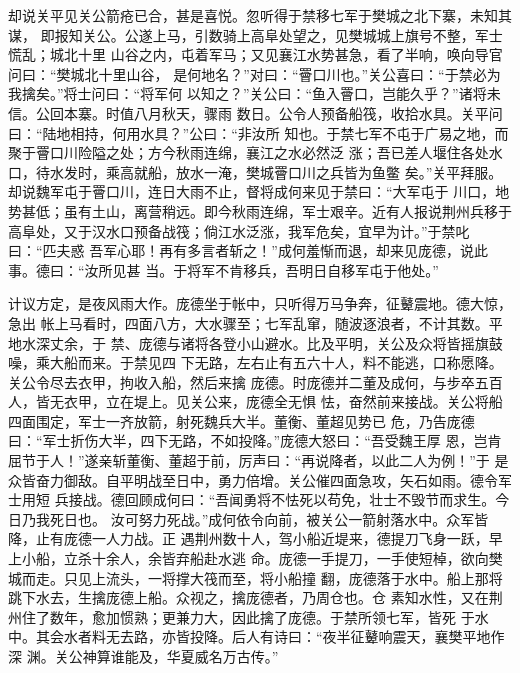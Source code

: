 却说关平见关公箭疮已合，甚是喜悦。忽听得于禁移七军于樊城之北下寨，未知其谋，
即报知关公。公遂上马，引数骑上高阜处望之，见樊城城上旗号不整，军士慌乱；城北十里
山谷之内，屯着军马；又见襄江水势甚急，看了半响，唤向导官问曰：“樊城北十里山谷，
是何地名？”对曰：“罾口川也。”关公喜曰：“于禁必为我擒矣。”将士问曰：“将军何
以知之？”关公曰：“鱼入罾口，岂能久乎？”诸将未信。公回本寨。时值八月秋天，骤雨
数日。公令人预备船筏，收拾水具。关平问曰：“陆地相持，何用水具？”公曰：“非汝所
知也。于禁七军不屯于广易之地，而聚于罾口川险隘之处；方今秋雨连绵，襄江之水必然泛
涨；吾已差人堰住各处水口，待水发时，乘高就船，放水一淹，樊城罾口川之兵皆为鱼鳖
矣。”关平拜服。却说魏军屯于罾口川，连日大雨不止，督将成何来见于禁曰：“大军屯于
川口，地势甚低；虽有土山，离营稍远。即今秋雨连绵，军士艰辛。近有人报说荆州兵移于
高阜处，又于汉水口预备战筏；倘江水泛涨，我军危矣，宜早为计。”于禁叱曰：“匹夫惑
吾军心耶！再有多言者斩之！”成何羞惭而退，却来见庞德，说此事。德曰：“汝所见甚
当。于将军不肯移兵，吾明日自移军屯于他处。”

计议方定，是夜风雨大作。庞德坐于帐中，只听得万马争奔，征鼙震地。德大惊，急出
帐上马看时，四面八方，大水骤至；七军乱窜，随波逐浪者，不计其数。平地水深丈余，于
禁、庞德与诸将各登小山避水。比及平明，关公及众将皆摇旗鼓噪，乘大船而来。于禁见四
下无路，左右止有五六十人，料不能逃，口称愿降。关公令尽去衣甲，拘收入船，然后来擒
庞德。时庞德并二董及成何，与步卒五百人，皆无衣甲，立在堤上。见关公来，庞德全无惧
怯，奋然前来接战。关公将船四面围定，军士一齐放箭，射死魏兵大半。董衡、董超见势已
危，乃告庞德曰：“军士折伤大半，四下无路，不如投降。”庞德大怒曰：“吾受魏王厚
恩，岂肯屈节于人！”遂亲斩董衡、董超于前，厉声曰：“再说降者，以此二人为例！”于
是众皆奋力御敌。自平明战至日中，勇力倍增。关公催四面急攻，矢石如雨。德令军士用短
兵接战。德回顾成何曰：“吾闻勇将不怯死以苟免，壮士不毁节而求生。今日乃我死日也。
汝可努力死战。”成何依令向前，被关公一箭射落水中。众军皆降，止有庞德一人力战。正
遇荆州数十人，驾小船近堤来，德提刀飞身一跃，早上小船，立杀十余人，余皆弃船赴水逃
命。庞德一手提刀，一手使短棹，欲向樊城而走。只见上流头，一将撑大筏而至，将小船撞
翻，庞德落于水中。船上那将跳下水去，生擒庞德上船。众视之，擒庞德者，乃周仓也。仓
素知水性，又在荆州住了数年，愈加惯熟；更兼力大，因此擒了庞德。于禁所领七军，皆死
于水中。其会水者料无去路，亦皆投降。后人有诗曰：“夜半征鼙响震天，襄樊平地作深
渊。关公神算谁能及，华夏威名万古传。”

